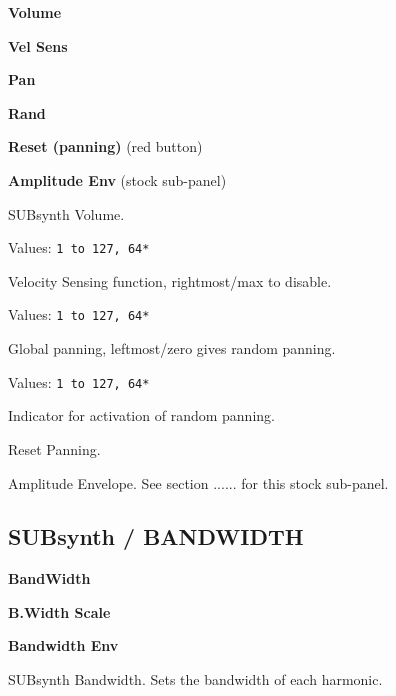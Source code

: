   \begin{enumber}
      \item \textbf{Volume}
      \item \textbf{Vel Sens}
      \item \textbf{Pan}
      \item \textbf{Rand}
      \item \textbf{Reset (panning)} (red button)
      \item \textbf{Amplitude Env} (stock sub-panel)
   \end{enumber}

   \setcounter{ItemCounter}{0}      %

   SUBsynth Volume.

   Values: \texttt{1 to 127, 64*}

   Velocity Sensing function, rightmost/max to disable.

   Values: \texttt{1 to 127, 64*}

   Global panning, leftmost/zero gives random panning.

   Values: \texttt{1 to 127, 64*}

   Indicator for activation of random panning.

   Reset Panning.

   Amplitude Envelope.
   See section ...... for this stock sub-panel.

\subsection{SUBsynth / BANDWIDTH}
\label{subsec:subsynth_bandwidth}

   \begin{enumber}
      \item \textbf{BandWidth}
      \item \textbf{B.Width Scale}
      \item \textbf{Bandwidth Env}
   \end{enumber}

   \setcounter{ItemCounter}{0}      %

   SUBsynth Bandwidth.
   Sets the bandwidth of each harmonic.

